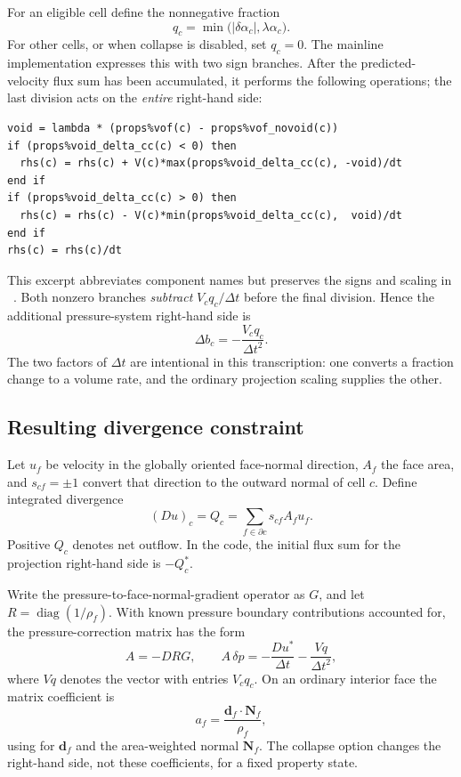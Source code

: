 \documentclass[11pt,letterpaper]{article}
\newcommand{\code}[1]{\texttt{\detokenize{#1}}}
\begin{document}
For an eligible cell define the nonnegative fraction
\begin{equation}
 q_c=\min\bigl(|\delta\alpha_c|,\lambda\alpha_c\bigr).
 \label{eq:q}
\end{equation}
For other cells, or when collapse is disabled, set $q_c=0$. The mainline
implementation expresses this with two sign branches. After the
predicted-velocity flux sum has been accumulated, it performs the following
operations; the last division acts on the \emph{entire} right-hand side:
\begin{lstlisting}
void = lambda * (props%vof(c) - props%vof_novoid(c))
if (props%void_delta_cc(c) < 0) then
  rhs(c) = rhs(c) + V(c)*max(props%void_delta_cc(c), -void)/dt
end if
if (props%void_delta_cc(c) > 0) then
  rhs(c) = rhs(c) - V(c)*min(props%void_delta_cc(c),  void)/dt
end if
rhs(c) = rhs(c)/dt
\end{lstlisting}
This excerpt abbreviates component names but preserves the signs and
scaling in \code{setup_solver}~\cite{projection}. Both nonzero branches
\emph{subtract} $V_cq_c/\Delta t$ before the final division. Hence the
additional pressure-system right-hand side is
\begin{equation}
 \boxed{\Delta b_c=-\frac{V_cq_c}{\Delta t^2}.}
 \label{eq:rhs}
\end{equation}
The two factors of $\Delta t$ are intentional in this transcription: one
converts a fraction change to a volume rate, and the ordinary projection
scaling supplies the other.

\subsection{Resulting divergence constraint}

Let $u_f$ be velocity in the globally oriented face-normal direction, $A_f$
the face area, and $s_{cf}=\pm1$ convert that direction to the outward normal
of cell $c$. Define integrated divergence
\begin{equation}
 (D u)_c = Q_c = \sum_{f\in\partial c}s_{cf}A_fu_f.
\end{equation}
Positive $Q_c$ denotes net outflow. In the code, the initial flux sum for the
projection right-hand side is $-Q_c^*$.

Write the pressure-to-face-normal-gradient operator as $G$, and let
$R=\operatorname{diag}(1/\rho_f)$. With known pressure boundary contributions
accounted for, the pressure-correction matrix has the form
\begin{equation}
 A=-D R G,\qquad
 A\,\delta p=-\frac{D u^*}{\Delta t}
              -\frac{Vq}{\Delta t^2},
 \label{eq:projection}
\end{equation}
where $Vq$ denotes the vector with entries $V_cq_c$. On an ordinary
interior face the matrix coefficient is
\begin{equation}
 a_f=\frac{\boldsymbol d_f\cdot\boldsymbol N_f}{\rho_f},
\end{equation}
using \code{flow_gradient_coefficients()} for $\boldsymbol d_f$ and the
area-weighted normal $\boldsymbol N_f$. The collapse option changes the
right-hand side, not these coefficients, for a fixed property state.
\end{document}
